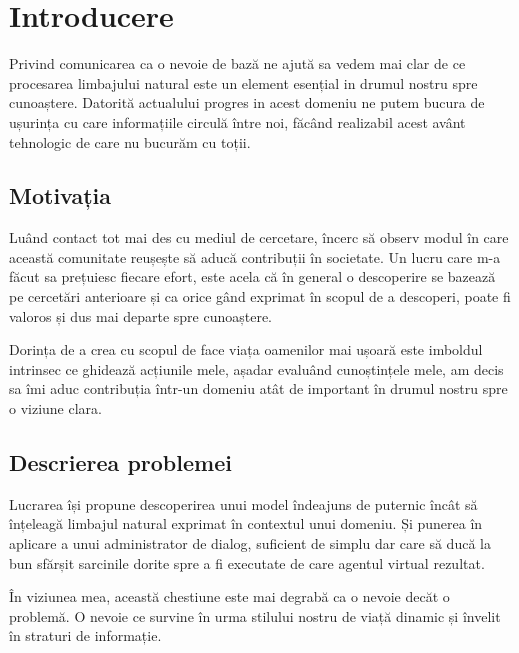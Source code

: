 \chapter{Introducere}

Privind comunicarea ca o nevoie de bază ne ajută sa vedem mai clar de ce procesarea limbajului natural este un element esențial in drumul nostru spre cunoaștere. Datorită actualului progres in acest domeniu ne putem bucura de ușurința cu care informațiile circulă între noi, făcând realizabil acest avânt tehnologic de care nu bucurăm cu toții.


\section{Motivația}

Luând contact tot mai des cu mediul de cercetare, încerc să observ modul în care această comunitate reușește să aducă contribuții în societate. Un lucru care m-a făcut sa prețuiesc fiecare efort, este acela că în general o descoperire se bazează pe cercetări anterioare și ca orice gând exprimat în scopul de a descoperi, poate fi valoros și dus mai departe spre cunoaștere.

Dorința de a crea cu scopul de face viața oamenilor mai ușoară este imboldul intrinsec ce ghidează acțiunile mele, așadar evaluând cunoștințele mele, am decis sa îmi aduc contribuția într-un domeniu atât de important în drumul nostru spre o viziune clara.

\section{Descrierea problemei}

Lucrarea își propune descoperirea unui model îndeajuns de puternic încât să înțeleagă limbajul natural exprimat în contextul unui domeniu. Și punerea în aplicare a unui administrator de dialog, suficient de simplu dar care să ducă la bun sfărșit sarcinile dorite spre a fi executate de care agentul virtual rezultat.

În viziunea mea, această chestiune este mai degrabă ca o nevoie decăt o problemă. O nevoie ce survine în urma stilului nostru de viață dinamic și învelit în straturi de informație.

